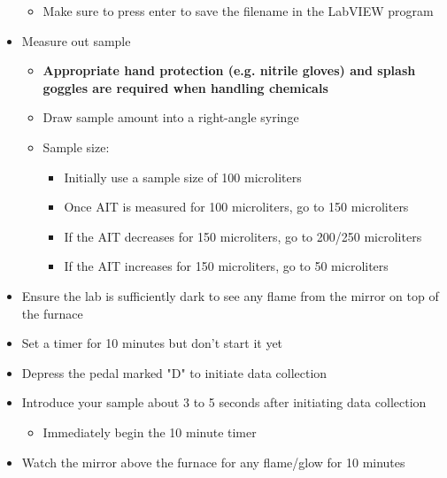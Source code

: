 \documentclass[letterpaper,11pt]{article}
\begin{document}
\begin{itemize}
\begin{itemize}
        \item Make sure to press enter to save the filename in the LabVIEW 
            program
        \end{itemize}

    \item Measure out sample
    
        \begin{itemize}
        \item \textbf{Appropriate hand protection (e.g. nitrile gloves) and 
            splash goggles are required when handling chemicals}
        \item Draw sample amount into a right-angle syringe
        \item Sample size:
        
            \begin{itemize}
            \item Initially use a sample size of 100 microliters
            \item Once AIT is measured for 100 microliters, go to 150 
                microliters
            \item If the AIT decreases for 150 microliters, go to 200/250 
                microliters
            \item If the AIT increases for 150 microliters, go to 50 microliters
            \end{itemize}
        
        \end{itemize}
        
    \item Ensure the lab is sufficiently dark to see any flame from the mirror
        on top of the furnace
    \item Set a timer for 10 minutes but don't start it yet
    \item Depress the pedal marked "D" to initiate data collection
    \item Introduce your sample about 3 to 5 seconds after initiating data 
        collection
        
        \begin{itemize}
        \item Immediately begin the 10 minute timer
        \end{itemize}    
            
    \item Watch the mirror above the furnace for any flame/glow for 10 minutes
        

\end{itemize}
\end{document}
